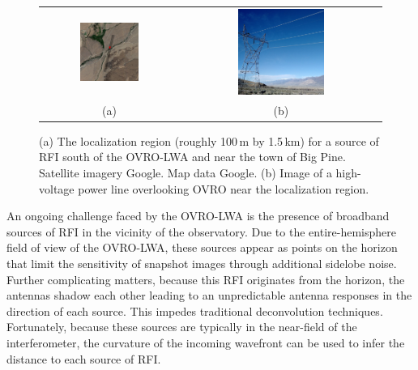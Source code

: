 \begin{bibunit}
\begin{figure}
    \centering
    \begin{tabular}{cc}
        \includegraphics[width=0.45\textwidth]{figures/chapter2/google-maps-rfi-localization} &
        \includegraphics[width=0.45\textwidth]{figures/chapter2/power-line-picture} \\
        (a) & (b) \\
    \end{tabular}
    \caption{
        (a) The localization region (roughly 100\,m by 1.5\,km) for a source of RFI south of the
        OVRO-LWA and near the town of Big Pine. Satellite imagery  Google. Map
        data  Google.
        (b) Image of a high-voltage power line overlooking OVRO near the localization region.
    }
    \label{fig:rfi-localization}
\end{figure}

An ongoing challenge faced by the OVRO-LWA is the presence of broadband sources of RFI in the
vicinity of the observatory. Due to the entire-hemisphere field of view of the OVRO-LWA, these
sources appear as points on the horizon that limit the sensitivity of snapshot images through
additional sidelobe noise. Further complicating matters, because this RFI originates from the
horizon, the antennas shadow each other leading to an unpredictable antenna responses in the
direction of each source. This impedes traditional deconvolution techniques.  Fortunately, because
these sources are typically in the near-field of the interferometer, the curvature of the incoming
wavefront can be used to infer the distance to each source of RFI.


\end{bibunit}
